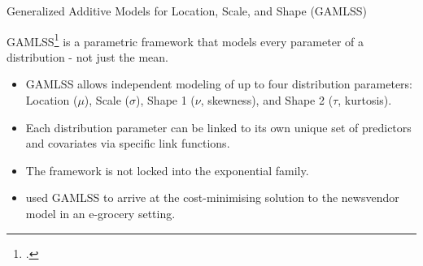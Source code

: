 \documentclass[11pt]{beamer}
\begin{document}
\begin{frame}{Generalized Additive Models for Location, Scale, and Shape (GAMLSS)}
\begin{small}
GAMLSS\footcite[Introduced by][]{rigby2005} is a parametric framework that models every parameter of a distribution - not just the mean.
\begin{itemize}
\item GAMLSS allows independent modeling of up to four distribution parameters: Location ($\mu$), Scale ($\sigma$), Shape 1 ($\nu$, skewness), and Shape 2 ($\tau$, kurtosis).

\item Each distribution parameter can be linked to its own unique set of predictors and covariates via specific link functions.

\item The framework is not locked into the exponential family.

\item \textcite{ulrich2021} used GAMLSS to arrive at the cost-minimising solution to the newsvendor model in an e-grocery setting. 
\end{itemize}
\end{small}
\end{frame}
\end{document}
